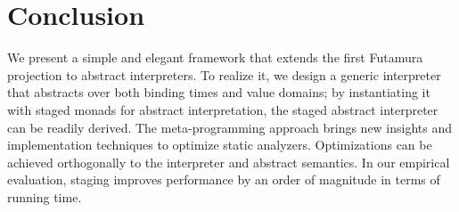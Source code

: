 \section{Conclusion}

We present a simple and elegant framework that extends the first Futamura
projection to abstract interpreters.
To realize it, we design a generic interpreter that abstracts over both
binding times and value domains; by instantiating it with staged monads for
abstract interpretation, the staged abstract interpreter can be readily derived.
The meta-programming approach brings new insights and implementation techniques
to optimize static analyzers. Optimizations can be achieved orthogonally to
the interpreter and abstract semantics.  In our empirical evaluation, staging
improves performance by an order of magnitude in terms of running time.
